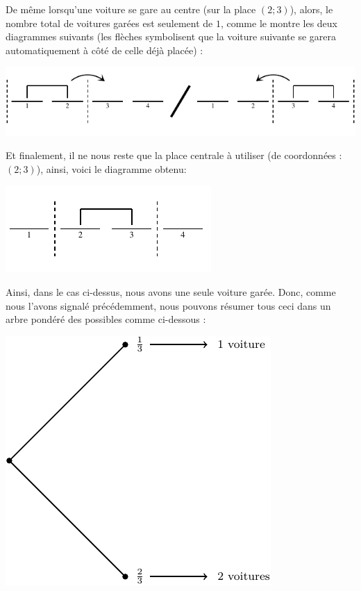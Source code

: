 \documentclass[a4paper,francais,11pt]{article}
\begin{document}
De même lorsqu'une voiture se gare au centre (sur la place $(2;3)$), alors, le nombre total de voitures garées est seulement de $1$, comme le montre les deux diagrammes suivants (les flèches symbolisent que la voiture suivante se garera automatiquement à côté de celle déjà placée) :
\begin{center}
\includegraphics{fig10.pdf}
\end{center}

Et finalement, il ne nous reste que la place centrale à utiliser (de coordonnées : $(2;3)$), ainsi, voici le diagramme obtenu:
\begin{center}
\includegraphics{fig11.pdf}
\end{center}

Ainsi, dans le cas ci-dessus, nous avons une seule voiture garée. Donc, comme nous l'avons signalé précédemment, nous pouvons résumer tous ceci dans un arbre pondéré des possibles comme ci-dessous :
\begin{center}
\includegraphics{fig12.pdf}
\end{center}
\end{document}
